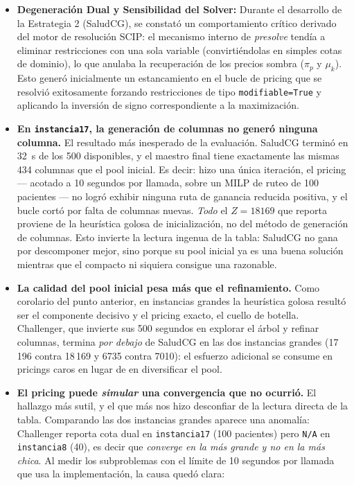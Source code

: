 \documentclass[12pt]{article}
\numberwithin{algorithm}{section}
\begin{document}
\begin{itemize}
    \item \textbf{Degeneración Dual y Sensibilidad del Solver:} Durante el desarrollo de la Estrategia 2 (SaludCG), se constató un comportamiento crítico derivado del motor de resolución SCIP: el mecanismo interno de \textit{presolve} tendía a eliminar restricciones con una sola variable (convirtiéndolas en simples cotas de dominio), lo que anulaba la recuperación de los precios sombra ($\pi_p$ y $\mu_k$). Esto generó inicialmente un estancamiento en el bucle de pricing que se resolvió exitosamente forzando restricciones de tipo \texttt{modifiable=True} y aplicando la inversión de signo correspondiente a la maximización.

    \item \textbf{En \texttt{instancia17}, la generación de columnas no generó ninguna columna.} El resultado más inesperado de la evaluación. SaludCG terminó en 32~s de los 500 disponibles, y el maestro final tiene exactamente las mismas 434 columnas que el pool inicial. Es decir: hizo una única iteración, el pricing --- acotado a 10 segundos por llamada, sobre un MILP de ruteo de 100 pacientes --- no logró exhibir ninguna ruta de ganancia reducida positiva, y el bucle cortó por falta de columnas nuevas. \emph{Todo} el $Z = 18169$ que reporta proviene de la heurística golosa de inicialización, no del método de generación de columnas. Esto invierte la lectura ingenua de la tabla: SaludCG no gana por descomponer mejor, sino porque su pool inicial ya es una buena solución mientras que el compacto ni siquiera consigue una razonable.

    \item \textbf{La calidad del pool inicial pesa más que el refinamiento.} Como corolario del punto anterior, en instancias grandes la heurística golosa resultó ser el componente decisivo y el pricing exacto, el cuello de botella. Challenger, que invierte sus 500 segundos en explorar el árbol y refinar columnas, termina \emph{por debajo} de SaludCG en las dos instancias grandes (17\,196 contra 18\,169 y 6735 contra 7010): el esfuerzo adicional se consume en pricings caros en lugar de en diversificar el pool.

    \item \textbf{El pricing puede \emph{simular} una convergencia que no ocurrió.} El hallazgo más sutil, y el que más nos hizo desconfiar de la lectura directa de la tabla. Comparando las dos instancias grandes aparece una anomalía: Challenger reporta cota dual en \texttt{instancia17} (100 pacientes) pero \texttt{N/A} en \texttt{instancia8} (40), es decir que \emph{converge en la más grande y no en la más chica}. Al medir los subproblemas con el límite de 10 segundos por llamada que usa la implementación, la causa quedó clara:


\end{itemize}
\end{document}
